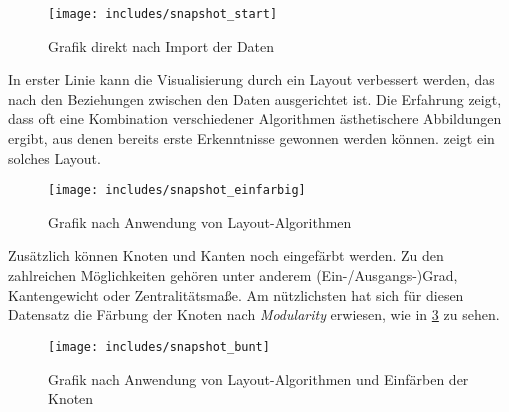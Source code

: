 \documentclass[a4paper,12pt,ngerman]{scrartcl}
\begin{document}
\begin{figure}[ht]
    \centering
    \texttt{[image: includes/snapshot\_start]}
    \caption{Grafik direkt nach Import der Daten}
    \label{fig:start}
\end{figure}

In erster Linie kann die Visualisierung durch ein Layout verbessert werden, das nach den Beziehungen zwischen den Daten ausgerichtet ist. Die Erfahrung zeigt, dass oft eine Kombination verschiedener Algorithmen ästhetischere Abbildungen ergibt, aus denen bereits erste Erkenntnisse gewonnen werden können.  zeigt ein solches Layout.

\begin{figure}[ht]
    \centering
    \texttt{[image: includes/snapshot\_einfarbig]}
    \caption{Grafik nach Anwendung von Layout-Algorithmen}
    \label{fig:einfarbig}
\end{figure}

Zusätzlich können Knoten und Kanten noch eingefärbt werden. Zu den zahlreichen Möglichkeiten gehören unter anderem (Ein-/Ausgangs-)Grad, Kantengewicht oder Zentralitätsmaße. Am nützlichsten hat sich für diesen Datensatz die Färbung der Knoten nach \emph{Modularity} erwiesen, wie in \cref{fig:bunt} zu sehen.

\begin{figure}[ht]
    \centering
    \texttt{[image: includes/snapshot\_bunt]}
    \caption{Grafik nach Anwendung von Layout-Algorithmen und Einfärben der Knoten}
    \label{fig:bunt}
\end{figure}
\end{document}

